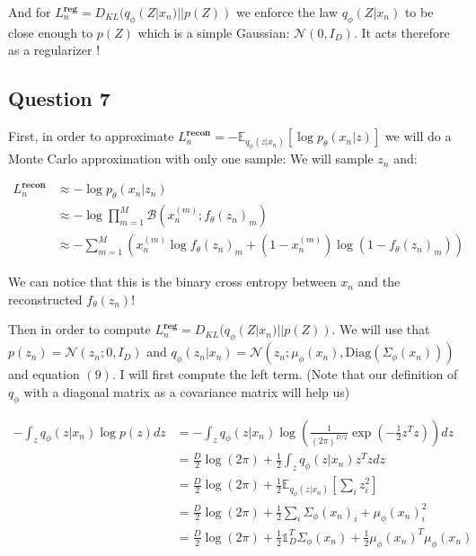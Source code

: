 \documentclass{article}
\begin{document}
And for $L_n^{\textbf{reg}} = D_{KL}(q_\phi(Z | x_n) || p(Z))$ we enforce the law $q_\phi( Z | x_n)$ to be close
enough to $p(Z)$ which is a simple Gaussian: $\mathcal{N}(0, I_D)$. It acts therefore as a regularizer !

\subsection*{Question 7}

First, in order to approximate $L_n^{\textbf{recon}} = - \mathbb{E}_{q_\phi(z|x_n)}\left[\log p_\theta(x_n | z) \right]$ we will do a
Monte Carlo approximation with only one sample: We will sample $z_n$ and:

\begin{equation*}
    \begin{aligned}
        L_n^{\textbf{recon}} & \approx - \log p_\theta(x_n | z_n)                                                                               \\
                             & \approx - \log \prod_{m=1}^M\mathcal{B}\left(x_n^{(m)} ; f_\theta(z_n)_m\right)                                  \\
                             & \approx - \sum_{m=1}^M \left( x_n^{(m)} \log f_\theta(z_n)_m + (1 - x_n^{(m)}) \log(1 - f_\theta(z_n)_m) \right)
    \end{aligned}
\end{equation*}

We can notice that this is the binary cross entropy between $x_n$ and the reconstructed $f_\theta(z_n)$!

Then in order to compute $L_n^{\textbf{reg}} = D_{KL}(q_\phi(Z | x_n) || p(Z))$. We will use that $p(z_n) = \mathcal{N}(z_n; 0, I_D)$
and $q_\phi(z_n | x_n) = \mathcal{N}(z_n; \mu_\phi(x_n), \text{Diag}(\Sigma_\phi(x_n)))$ and equation $(9)$. I will first compute the left
term. (Note that our definition of $q_\phi$ with a diagonal matrix as a covariance matrix will help us)

\begin{equation*}
    \begin{aligned}
        - \int_z q_\phi(z | x_n) \log p(z) dz & = - \int_z q_\phi(z | x_n) \log\left( \frac{1}{(2\pi)^{D/2}} \exp\left(-\frac{1}{2}z^Tz\right)\right)dz           \\
                                              & = \frac{D}{2}\log(2\pi) + \frac{1}{2} \int_z q_\phi(z | x_n) z^Tz dz                                              \\
                                              & = \frac{D}{2}\log(2\pi) + \frac{1}{2} \mathbb{E}_{q_\phi(z | x_n)}\left[\sum_i z_{i}^2\right]                     \\
                                              & = \frac{D}{2}\log(2\pi) + \frac{1}{2} \sum_i \Sigma_\phi(x_n)_i + \mu_\phi(x_n)_i^2                               \\
                                              & = \frac{D}{2}\log(2\pi) + \frac{1}{2} \mathds{1}_D^T\Sigma_\phi(x_n) + \frac{1}{2}  \mu_\phi(x_n)^T \mu_\phi(x_n) \\
    \end{aligned}
\end{equation*}
\end{document}
